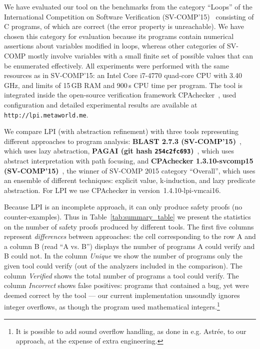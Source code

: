 \documentclass{llncs}
\begin{document}
We have evaluated our tool on the benchmarks from the category ``Loops''
of the International Competition on Software Verification (SV-COMP'15)~\cite{svcomp15}
consisting of  C programs,  of which are correct (the error property is
unreachable).
We have chosen this category for evaluation because
its programs contain numerical assertions about variables modified in loops,
whereas other categories of SV-COMP
mostly involve variables with a small finite set of possible values
that can be enumerated effectively.
All experiments were performed
with the same resources as in SV-COMP'15:
an Intel Core i7-4770 quad-core CPU with 3.40\,GHz,
and limits of 15\,GB RAM and 900\,s CPU time per program.
The tool is integrated inside the open-source verification framework
CPAchecker~\cite{cpachecker},
used configuration and detailed experimental results are available at
\texttt{http://lpi.metaworld.me}.

We compare LPI (with abstraction refinement) with three tools
representing different approaches to program analysis:
    \textbf{BLAST 2.7.3 (SV-COMP'15)}~\cite{blast_svcomp}, which uses lazy abstraction,
    \textbf{PAGAI (git hash \texttt{254c2fc693})}~\cite{pagai}, which uses abstract interpretation with path
        focusing, and
    \textbf{CPAchecker 1.3.10-svcomp15 (SV-COMP'15)}~\cite{cpachecker}, the winner of SV-COMP
    2015 category ``Overall'',
        which uses an ensemble of different techniques: explicit value, k-induction, and
        lazy predicate abstraction.
For LPI we use CPAchecker in version~1.4.10-lpi-vmcai16.

Because LPI is an incomplete approach, it can only produce safety proofs
(no counter-examples).
Thus in Table~\ref{tab:summary_table} we present the
statistics on the number of safety proofs produced by different tools.
The first five columns represent \emph{differences} between
approaches: the cell corresponding to the row A and a column B (read ``A vs.
B'') displays the number of programs A could verify and B could not.
In the column \emph{Unique} we show the number of programs only the given tool
could verify (out of the analyzers included in the comparison).
The column \emph{Verified} shows the total number of programs a tool could
verify.
The column \emph{Incorrect} shows false positives: programs that contained a
bug, yet were deemed correct by the tool --- our current implementation unsoundly ignores integer overflows, as though the program used mathematical integers.\footnote{It is possible to add sound overflow handling, as done in e.g. Astr\'ee, to our
approach, at the expense of extra engineering.}
\end{document}

